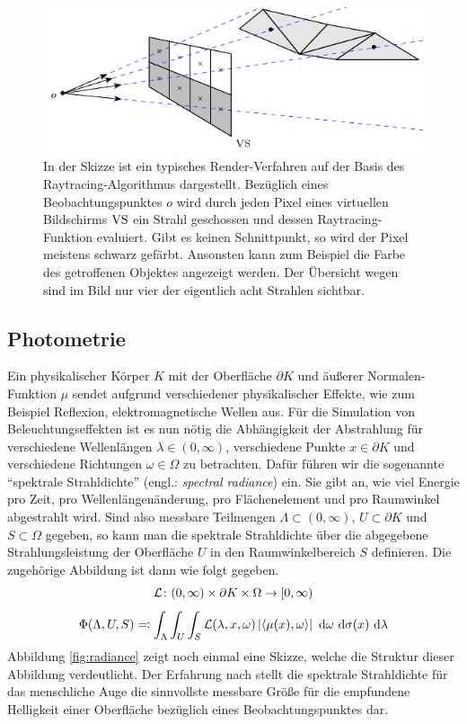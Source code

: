 		\begin{figure}
			\center
			\includegraphics{gg_fig/ray_tracing_2.pdf}
			\caption{In der Skizze ist ein typisches Render-Verfahren auf der Basis des Raytracing-Algorithmus dargestellt. Bezüglich eines Beobachtungspunktes $o$ wird durch jeden Pixel eines virtuellen Bildschirms $\mathrm{VS}$ ein Strahl geschossen und dessen Raytracing-Funktion evaluiert. Gibt es keinen Schnittpunkt, so wird der Pixel meistens schwarz gefärbt. Ansonsten kann zum Beispiel die Farbe des getroffenen Objektes angezeigt werden. Der Übersicht wegen sind im Bild nur vier der eigentlich acht Strahlen sichtbar.}
			\label{fig:ray_tracing-2}
		\end{figure}


	\subsection{Photometrie} %
	\label{sub:photometrie}

		Ein physikalischer Körper $K$ mit der Oberfläche $\partial K$ und äußerer Normalen-Funktion $\mu$ sendet aufgrund verschiedener physikalischer Effekte, wie zum Beispiel Reflexion, elektromagnetische Wellen aus.
		Für die Simulation von Beleuchtungseffekten ist es nun nötig die Abhängigkeit der Abstrahlung für verschiedene Wellenlängen $\lambda\in(0,\infty)$, verschiedene Punkte $x\in\partial K$ und verschiedene Richtungen $\omega\in\Omega$ zu betrachten.
		Dafür führen wir die sogenannte \enquote{spektrale Strahldichte} (engl.: \textit{spectral radiance}) ein.
		Sie gibt an, wie viel Energie pro Zeit, pro Wellenlängenänderung, pro Flächenelement und pro Raumwinkel abgestrahlt wird.
		Sind also messbare Teilmengen $\Lambda\subset (0,\infty)$, $U\subset \partial K$ und $S\subset\Omega$ gegeben, so kann man die spektrale Strahldichte über die abgegebene Strahlungsleistung der Oberfläche $U$ in den Raumwinkelbereich $S$ definieren.
		Die zugehörige Abbildung ist dann wie folgt gegeben.
		\[
			\mathcal{L}\colon(0,\infty)\times\partial K\times \Omega\to[0,\infty)
		\]
		\[
			\Phi(\Lambda,U,S) \eqqcolon \int_{\Lambda}^{}  \int_{U}^{}  \int_{S}^{}  \mathcal{L}(\lambda,x,\omega)\left\vert \left\langle \mu(x),\omega \right\rangle \right\vert \ \mathrm{d} \omega \ \mathrm{d} \sigma(x) \ \mathrm{d} \lambda
		\]
		Abbildung \ref{fig:radiance} zeigt noch einmal eine Skizze, welche die Struktur dieser Abbildung verdeutlicht.
		Der Erfahrung nach stellt die spektrale Strahldichte für das menschliche Auge die sinnvollste messbare Größe für die empfundene Helligkeit einer Oberfläche bezüglich eines Beobachtungspunktes dar.

